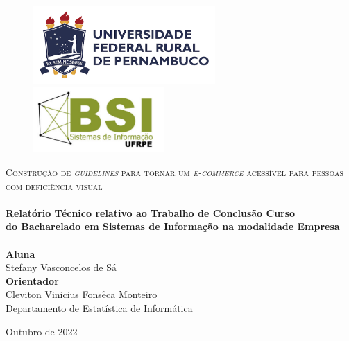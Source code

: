 \begin{titlepage}
\begin{center}


\begin{figure}[ht]
		\includegraphics[height=3cm]{images/logo_ufrpe_horizontal.png}
		\hspace{3.5cm}
    	\includegraphics[height=2.5cm]{images/logo_bsi .pdf}
	\end{figure}   

\vspace{1cm}

\textsc{\large Construção de \textit{guidelines} para tornar um \textit{e-commerce} acessível para pessoas com deficiência visual} \\


\HRule \\[0.4cm]
{\large \bfseries Relatório Técnico relativo ao Trabalho de Conclusão Curso \\
do Bacharelado em Sistemas de Informação na modalidade Empresa \\[0.4cm]}
\HRule 
\\[2cm]

\large\textbf{Aluna}\\
Stefany Vasconcelos de Sá\\[1cm]

\large\textbf{Orientador}\\
Cleviton Vinicius Fonsêca Monteiro\\
Departamento de Estatística de Informática\\[1cm]




\vfill

{\large Outubro de 2022}
\end{center}


\end{titlepage}
